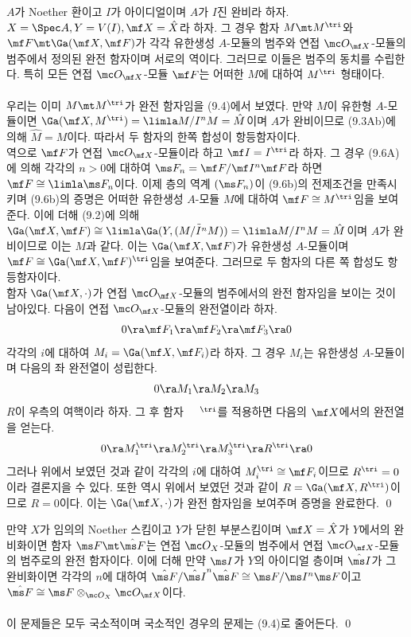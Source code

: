 	
	\begin{theorem}
	$A$가 Noether 환이고 $I$가 아이디얼이며 $A$가 $I$진 완비라 하자. $X=\Spec A,Y=V(I),\mf X=\hat X$라 하자.
	그 경우 함자 $M\mt M^\tri$와 $\mf F\mt\Ga(\mf X,\mf F)$가 각각
	유한생성 $A$-모듈의 범주와 연접 $\mc O_{\mf X}$-모듈의 범주에서 정의된 완전 함자이며 서로의 역이다.
	그러므로 이들은 범주의 동치를 수립한다. 특히 모든 연접 $\mc O_{\mf X}$-모듈 $\mf F$는 어떠한 $M$에 대하여 $M^\tri$ 형태이다.\\\\
	\pf 우리는 이미 $M\mt M^\tri$가 완전 함자임을 (9.4)에서 보였다.
	만약 $M$이 유한형 $A$-모듈이면 $\Ga(\mf X,M^\tri)=\limla M/I^nM=\hat M$이며 $A$가 완비이므로 (9.3Ab)에 의해 $\hat M=M$이다.
	따라서 두 함자의 한쪽 합성이 항등함자이다.\\
	역으로 $\mf F$가 연접 $\mc O_{\mf X}$-모듈이라 하고 $\mf I=I^\tri$라 하자.
	그 경우 (9.6A)에 의해 각각의 $n>0$에 대하여 $\ms F_n=\mf F/\mf I^n\mf F$라 하면 $\mf F\cong\limla\ms F_n$이다.
	이제 층의 역계 $(\ms F_n)$이 (9.6b)의 전제조건을 만족시키며
	(9.6b)의 증명은 어떠한 유한생성 $A$-모듈 $M$에 대하여 $\mf F\cong M^\tri$임을 보여준다.
	이에 더해 (9.2)에 의해 $\Ga(\mf X,\mf F)\cong\limla\Ga(Y,\tilde{(M/I^nM)})=\limla M/I^nM=\hat M$이며
	$A$가 완비이므로 이는 $M$과 같다. 이는 $\Ga(\mf X,\mf F)$가 유한생성 $A$-모듈이며 $\mf F\cong\Ga(\mf X,\mf F)^\tri$임을 보여준다.
	그러므로 두 함자의 다른 쪽 합성도 항등함자이다.\\
	함자 $\Ga(\mf X,\cdot)$가 연접 $\mc O_{\mf X}$-모듈의 범주에서의 완전 함자임을 보이는 것이 남아있다.
	다음이 연접 $\mc O_{\mf X}$-모듈의 완전열이라 하자.
	$$0\ra\mf F_1\ra\mf F_2\ra\mf F_3\ra 0$$
	각각의 $i$에 대하여 $M_i=\Ga(\mf X,\mf F_i)$라 하자. 그 경우 $M_i$는 유한생성 $A$-모듈이며 다음의 좌 완전열이 성립한다.
	$$0\ra M_1\ra M_2\ra M_3$$
	$R$이 우측의 여핵이라 하자. 그 후 함자 $\phantom{M}^\tri$를 적용하면 다음의 $\mf X$에서의 완전열을 얻는다.
	$$0\ra M_1^\tri\ra M_2^\tri\ra M_3^\tri\ra R^\tri\ra 0$$
	그러나 위에서 보였던 것과 같이 각각의 $i$에 대하여 $M_i^\tri\cong\mf F_i$이므로 $R^\tri=0$이라 결론지을 수 있다.
	또한 역시 위에서 보였던 것과 같이 $R=\Ga(\mf X,R^\tri)$이므로 $R=0$이다.
	이는 $\Ga(\mf X,\cdot)$가 완전 함자임을 보여주며 증명을 완료한다.
	\qed
	\end{theorem}
	
	
	\begin{corollary}
	만약 $X$가 임의의 Noether 스킴이고 $Y$가 닫힌 부분스킴이며 $\mf X=\hat X$가 $Y$에서의 완비화이면
	함자 $\ms F\mt\hat{\ms F}$는 연접 $\mc O_X$-모듈의 범주에서 연접 $\mc O_{\mf X}$-모듈의 범주로의 완전 함자이다.
	이에 더해 만약 $\ms I$가 $Y$의 아이디얼 층이며 $\hat{\ms I}$가 그 완비화이면
	각각의 $n$에 대하여 $\hat{\ms F}/\hat{\ms I}^n\hat{\ms F}\cong\ms F/\ms I^n\ms F$이고
	$\hat{\ms F}\cong\ms F\otimes_{\mc O_X}\mc O_{\mf X}$이다.\\\\
	\pf 이 문제들은 모두 국소적이며 국소적인 경우의 문제는 (9.4)로 줄어든다.
	\qed
	\end{corollary}
	
